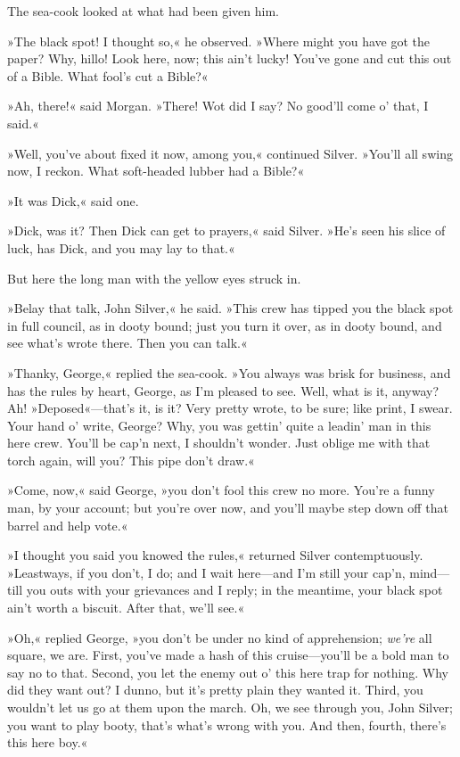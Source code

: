 The sea-cook looked at what had been given him.

»The black spot! I thought so,« he observed. »Where might you have got the paper? Why, hillo! Look here, now; this ain't lucky! You've gone and cut this out of a Bible. What fool's cut a Bible?«

»Ah, there!« said Morgan. »There! Wot did I say? No good'll come o' that, I said.«

»Well, you've about fixed it now, among you,« continued Silver. »You'll all swing now, I reckon. What soft-headed lubber had a Bible?«

»It was Dick,« said one.

»Dick, was it? Then Dick can get to prayers,« said Silver. »He's seen his slice of luck, has Dick, and you may lay to that.«

But here the long man with the yellow eyes struck in.

»Belay that talk, John Silver,« he said. »This crew has tipped you the black spot in full council, as in dooty bound; just you turn it over, as in dooty bound, and see what's wrote there. Then you can talk.«

»Thanky, George,« replied the sea-cook. »You always was brisk for business, and has the rules by heart, George, as I'm pleased to see. Well, what is it, anyway? Ah! »Deposed«—that's it, is it? Very pretty wrote, to be sure; like print, I swear. Your hand o' write, George? Why, you was gettin' quite a leadin' man in this here crew. You'll be cap'n next, I shouldn't wonder. Just oblige me with that torch again, will you? This pipe don't draw.«

»Come, now,« said George, »you don't fool this crew no more. You're a funny man, by your account; but you're over now, and you'll maybe step down off that barrel and help vote.«

»I thought you said you knowed the rules,« returned Silver contemptuously. »Leastways, if you don't, I do; and I wait here—and I'm still your cap'n, mind—till you outs with your grievances and I reply; in the meantime, your black spot ain't worth a biscuit. After that, we'll see.«

»Oh,« replied George, »you don't be under no kind of apprehension; \textit{we're} all square, we are. First, you've made a hash of this cruise—you'll be a bold man to say no to that. Second, you let the enemy out o' this here trap for nothing. Why did they want out? I dunno, but it's pretty plain they wanted it. Third, you wouldn't let us go at them upon the march. Oh, we see through you, John Silver; you want to play booty, that's what's wrong with you. And then, fourth, there's this here boy.«

